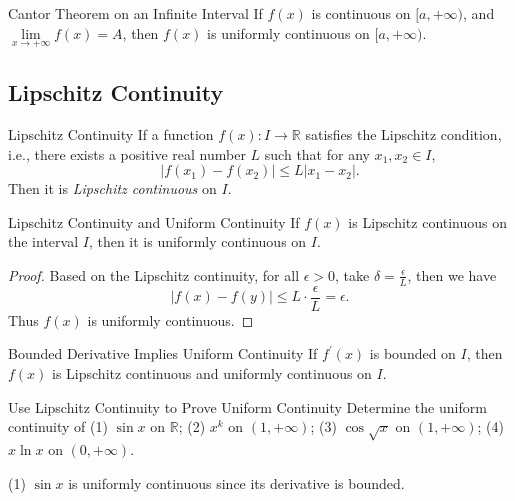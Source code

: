\begin{theorem}{Cantor Theorem on an Infinite Interval}{}
  If $f(x)$ is continuous on $[a, +\infty)$,
  and $\lim \limits _{x \rightarrow +\infty} f(x) = A$,
  then $f(x)$ is uniformly continuous on $[a, +\infty)$.
\end{theorem}


\subsection{Lipschitz Continuity}

\begin{definition}{Lipschitz Continuity}{}
  If a function $f(x): I \rightarrow \mathbb{R}$
  satisfies the Lipschitz condition, i.e.,
  there exists a positive real number $L$ such that
  for any $x_1, x_2 \in I$,
  \begin{equation}
    |f(x_1) - f(x_2)| \leq L |x_1 - x_2|.
  \end{equation}
  Then it is \emph{Lipschitz continuous} on $I$.
\end{definition}

\begin{proposition}{Lipschitz Continuity and Uniform Continuity}{}
  If $f(x)$ is Lipschitz continuous on the interval $I$,
  then it is uniformly continuous on $I$.
\end{proposition}

\begin{proof}
  Based on the Lipschitz continuity, for all $\epsilon > 0$,
  take $\delta = \frac{\epsilon}{L}$, then we have
  \begin{equation}
    |f(x) - f(y)| \leq L \cdot \frac{\epsilon}{L} = \epsilon.
  \end{equation}
  Thus $f(x)$ is uniformly continuous.
\end{proof}

\begin{corollary}{Bounded Derivative Implies Uniform Continuity}{}
  If $f^{\prime}(x)$ is bounded on $I$, then $f(x)$ is Lipschitz continuous and
  uniformly continuous on $I$.
\end{corollary}

\begin{example}{Use Lipschitz Continuity to Prove Uniform Continuity}{}
  Determine the uniform continuity of
  (1) $\sin x$ on $\mathbb{R}$;
  (2) $x^k$ on $(1, +\infty)$;
  (3) $\cos \sqrt{x}$ on $(1, +\infty)$;
  (4) $x \ln x$ on $(0, +\infty)$.
\end{example}

\begin{solution}
  (1) $\sin x$ is uniformly continuous since its derivative is bounded.
\end{solution}

